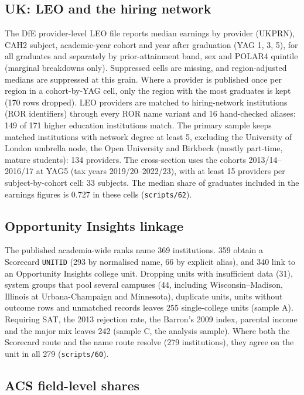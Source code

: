 \documentclass[11pt]{article}
\newcommand{\scr}[1]{\texttt{scripts/#1}}
\begin{document}
\subsection{UK: LEO and the hiring network}\label{sec:ukdata}

The DfE provider-level LEO file reports median earnings by provider (UKPRN), CAH2 subject, academic-year
cohort and year after graduation (YAG 1, 3, 5), for all graduates and separately by prior-attainment band,
sex and POLAR4 quintile (marginal breakdowns only). Suppressed cells are missing, and region-adjusted medians
are suppressed at this grain. Where a provider is published once per region in a cohort-by-YAG cell, only the
region with the most graduates is kept (170 rows dropped). LEO providers are matched to hiring-network
institutions (ROR identifiers) through every ROR name variant and 16 hand-checked aliases: 149 of 171 higher
education institutions match. The primary sample keeps matched institutions with network degree at least 5,
excluding the University of London umbrella node, the Open University and Birkbeck (mostly part-time, mature
students): 134 providers. The cross-section uses the cohorts 2013/14--2016/17 at YAG5 (tax years
2019/20--2022/23), with at least 15 providers per subject-by-cohort cell: 33 subjects. The median share of
graduates included in the earnings figures is 0.727 in these cells (\scr{62}).

\subsection{Opportunity Insights linkage}\label{sec:oidata}

The published academia-wide ranks name 369 institutions. 359 obtain a Scorecard \texttt{UNITID} (293 by
normalised name, 66 by explicit alias), and 340 link to an Opportunity Insights college unit. Dropping units
with insufficient data (31), system groups that pool several campuses (44, including Wisconsin--Madison,
Illinois at Urbana-Champaign and Minnesota), duplicate units, units without outcome rows and unmatched
records leaves 255 single-college units (sample A). Requiring SAT, the 2013 rejection rate, the Barron's 2009
index, parental income and the major mix leaves 242 (sample C, the analysis sample). Where both the Scorecard
route and the name route resolve (279 institutions), they agree on the unit in all 279 (\scr{60}).

\subsection{ACS field-level shares}\label{sec:acs}
\end{document}

